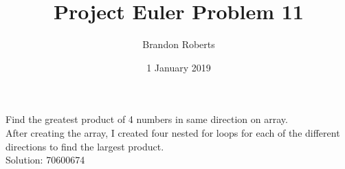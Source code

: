 \documentclass{article}
\begin{document}
\title{Project Euler Problem 11}
\author{Brandon Roberts}
\date{1 January 2019}

\maketitle

Find the greatest product of 4 numbers in same direction on array.\\
After creating the array, I created four nested for loops for each of the different directions to find the largest product.\\
Solution: 70600674
\end{document}
